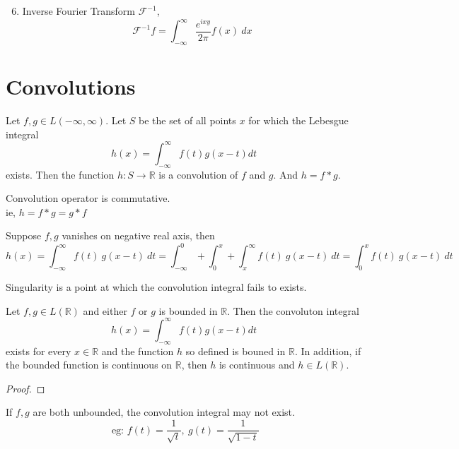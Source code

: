 \begin{enumerate}
	\setcounter{enumi}{5}
	\item Inverse Fourier Transform $\mathscr{F}^{-1}$,
		$$\mathscr{F}^{-1}f = \int_{-\infty}^\infty \frac{e^{ixy}}{2\pi}f(x)\ dx$$
\end{enumerate}

\section{Convolutions}
\begin{definition}
	Let $f,g \in L(-\infty,\infty)$. Let $S$ be the set of all points $x$ for which the Lebesgue integral
	$$h(x) = \int_{-\infty}^\infty f(t) g(x-t) dt$$
	exists. Then the function $h : S \to \mathbb{R}$ is a convolution of $f$ and $g$. And $h = f \ast g$.
\end{definition}

\begin{remark}
	Convolution operator is commutative.\\
	ie, $ h = f \ast g = g \ast f$
\end{remark}

\begin{remark}
	Suppose $f,g$ vanishes on negative real axis, then
	$$h(x) = \int_{-\infty}^\infty f(t)\ g(x-t)\ dt = \int_{-\infty}^0 + \int_0^x  + \int_x^\infty f(t)\ g(x-t)\ dt = \int_0^x f(t)\ g(x-t)\ dt $$ 
\end{remark}

\begin{remark}
	Singularity is a point at which the convolution integral fails to exists.
\end{remark}

\begin{theorem}
	Let $f,g \in L(\mathbb{R})$ and either $f$ or $g$ is bounded in $\mathbb{R}$. Then the convoluton integral
	$$h(x) = \int_{-\infty}^\infty f(t) g(x-t) dt$$
	exists for every $x \in \mathbb{R}$ and the function $h$ so defined is bouned in $\mathbb{R}$. In addition, if the bounded function is continuous on $\mathbb{R}$, then $h$ is continuous and $h \in L(\mathbb{R})$.
\end{theorem}
\begin{synopsis}
\end{synopsis}
\begin{proof}
\end{proof}

\begin{remark}
	If $f,g$ are both unbounded, the convolution integral may not exist.
	$$\text{ eg: } f(t) = \frac{1}{\sqrt{t}},\ g(t) = \frac{1}{\sqrt{1-t}}$$
\end{remark}


